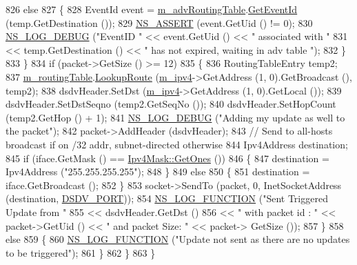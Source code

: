 \begin{DoxyCode}
826           \textcolor{keywordflow}{else}
827             \{
828               EventId \textcolor{keyword}{event} = \hyperlink{classns3_1_1dsdv_1_1RoutingProtocol_adce3cf63777d6099e58caa1cb198282c}{m\_advRoutingTable}.\hyperlink{classns3_1_1dsdv_1_1RoutingTable_aa7d334052c89ba061285d2a207a12cfe}{GetEventId} (temp.GetDestination 
      ());
829               \hyperlink{assert_8h_a6dccdb0de9b252f60088ce281c49d052}{NS\_ASSERT} (event.GetUid () != 0);
830               \hyperlink{group__logging_ga413f1886406d49f59a6a0a89b77b4d0a}{NS\_LOG\_DEBUG} (\textcolor{stringliteral}{"EventID "} << event.GetUid () << \textcolor{stringliteral}{" associated with "}
831                                        << temp.GetDestination () << \textcolor{stringliteral}{" has not expired, waiting in adv table
      "});
832             \}
833         \}
834       \textcolor{keywordflow}{if} (packet->GetSize () >= 12)
835         \{
836           RoutingTableEntry temp2;
837           \hyperlink{classns3_1_1dsdv_1_1RoutingProtocol_acc4cee466c2591e35f508ce58097a00e}{m\_routingTable}.\hyperlink{classns3_1_1dsdv_1_1RoutingTable_a0bfb9dc677f02bd740973865e38df763}{LookupRoute} (\hyperlink{classns3_1_1dsdv_1_1RoutingProtocol_a955477c7f38e64762a264c24e3762af6}{m\_ipv4}->GetAddress (1, 0).GetBroadcast
       (), temp2);
838           dsdvHeader.SetDst (\hyperlink{classns3_1_1dsdv_1_1RoutingProtocol_a955477c7f38e64762a264c24e3762af6}{m\_ipv4}->GetAddress (1, 0).GetLocal ());
839           dsdvHeader.SetDstSeqno (temp2.GetSeqNo ());
840           dsdvHeader.SetHopCount (temp2.GetHop () + 1);
841           \hyperlink{group__logging_ga413f1886406d49f59a6a0a89b77b4d0a}{NS\_LOG\_DEBUG} (\textcolor{stringliteral}{"Adding my update as well to the packet"});
842           packet->AddHeader (dsdvHeader);
843           \textcolor{comment}{// Send to all-hosts broadcast if on /32 addr, subnet-directed otherwise}
844           Ipv4Address destination;
845           \textcolor{keywordflow}{if} (iface.GetMask () == \hyperlink{classns3_1_1Ipv4Mask_af712cbdf28c039025d4aa45fa7e243dd}{Ipv4Mask::GetOnes} ())
846             \{
847               destination = Ipv4Address (\textcolor{stringliteral}{"255.255.255.255"});
848             \}
849           \textcolor{keywordflow}{else}
850             \{
851               destination = iface.GetBroadcast ();
852             \}
853           socket->SendTo (packet, 0, InetSocketAddress (destination, \hyperlink{classns3_1_1dsdv_1_1RoutingProtocol_a14b063286a3c34efb9537f6456af3271}{DSDV\_PORT}));
854           \hyperlink{log-macros-disabled_8h_a90b90d5bad1f39cb1b64923ea94c0761}{NS\_LOG\_FUNCTION} (\textcolor{stringliteral}{"Sent Triggered Update from "}
855                            << dsdvHeader.GetDst ()
856                            << \textcolor{stringliteral}{" with packet id : "} << packet->GetUid () << \textcolor{stringliteral}{" and packet Size: "} << packet->
      GetSize ());
857         \}
858       \textcolor{keywordflow}{else}
859         \{
860           \hyperlink{log-macros-disabled_8h_a90b90d5bad1f39cb1b64923ea94c0761}{NS\_LOG\_FUNCTION} (\textcolor{stringliteral}{"Update not sent as there are no updates to be triggered"});
861         \}
862     \}
863 \}
\end{DoxyCode}


